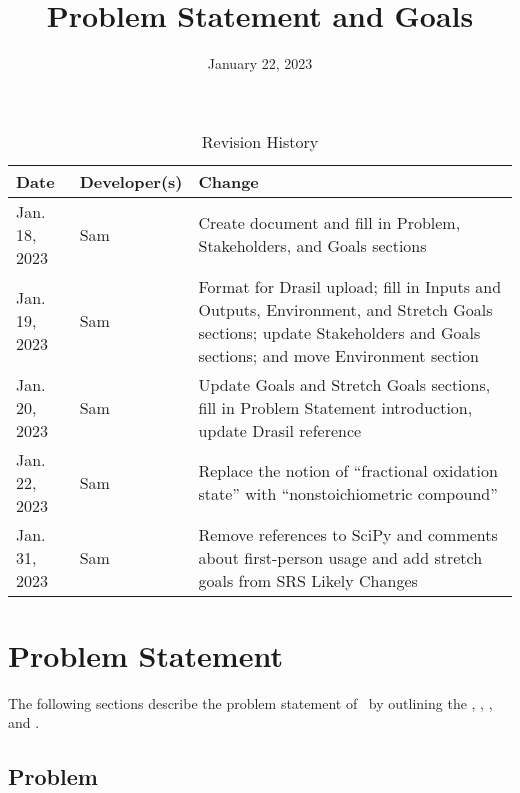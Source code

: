 \documentclass{article}
\title{Problem Statement and Goals\\\progname}
\author{\authname}
\date{January 22, 2023}
\begin{document}
\maketitle

\begin{table}[hp]
\caption{Revision History} \label{TblRevisionHistory}
\begin{tabularx}{\textwidth}{llX}
\toprule
\textbf{Date} & \textbf{Developer(s)} & \textbf{Change}\\
\midrule
Jan. 18, 2023 & Sam & Create document and fill in Problem, Stakeholders, and
								Goals sections\\
Jan. 19, 2023 & Sam & Format for Drasil upload; fill in Inputs and Outputs,
								Environment, and Stretch Goals sections; update Stakeholders and Goals
								sections; and move Environment section\\
Jan. 20, 2023 & Sam & Update Goals and Stretch Goals sections, fill in
								Problem Statement introduction, update Drasil reference\\
Jan. 22, 2023 & Sam & Replace the notion of ``fractional oxidation state'' with
								``nonstoichiometric compound''\\
Jan. 31, 2023 & Sam & Remove references to SciPy and comments about
								first-person usage and add stretch goals from SRS Likely Changes\\
\bottomrule
\end{tabularx}
\end{table}

\section{Problem Statement}

\null\newline
\null\newline
\noindent The following sections describe the problem statement of \progname~by outlining
the , , , and .

\subsection{Problem} \label{prob}
\end{document}
